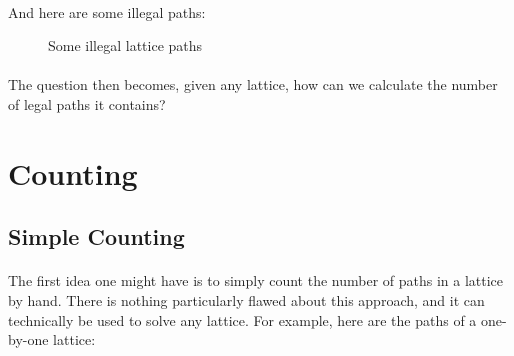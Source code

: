 \documentclass[12pt]{article}
\newcommand{\p}{\paragraph{}}
\begin{document}
		\newpage
		\p And here are some illegal paths:
		
		\begin{figure}[h]
			\centering
			\begin{subfigure}{.3\textwidth}
				\centering
			\end{subfigure}%
			\begin{subfigure}{.3\textwidth}
				\centering
			\end{subfigure}%
			\begin{subfigure}{.3\textwidth}
				\centering
			\end{subfigure}
			
			\caption{Some illegal lattice paths}
		\end{figure}
	
		\p The question then becomes, given any lattice, how can we calculate the number of legal paths it contains?
	
	\section{Counting}
	
		\subsection{Simple Counting}
			
			\p The first idea one might have is to simply count the number of paths in a lattice by hand. There is nothing particularly flawed about this approach, and it can technically be used to solve any lattice. For example, here are the paths of a one-by-one lattice:
			
\end{document}
